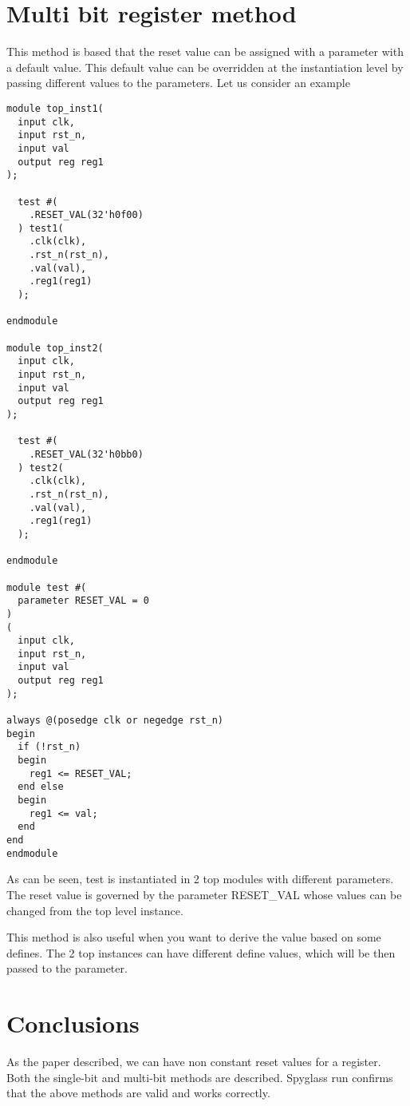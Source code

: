 \documentclass[twocolumn,10pt]{asme2ej}
\begin{document}
\section{Multi bit register method}
This method is based that the reset value can be assigned with a parameter
with a default value. 
This default value can be overridden at the instantiation level by passing
different values to the parameters. Let us consider an example

\begin{verbatim}
module top_inst1(
  input clk,
  input rst_n,
  input val
  output reg reg1
);

  test #(
    .RESET_VAL(32'h0f00)
  ) test1(
    .clk(clk),
    .rst_n(rst_n),
    .val(val),
    .reg1(reg1)
  );
  
endmodule

module top_inst2(
  input clk,
  input rst_n,
  input val
  output reg reg1
);

  test #(
    .RESET_VAL(32'h0bb0)
  ) test2(
    .clk(clk),
    .rst_n(rst_n),
    .val(val),
    .reg1(reg1)
  );
  
endmodule

module test #(
  parameter RESET_VAL = 0
)
(
  input clk,
  input rst_n,
  input val
  output reg reg1
);

always @(posedge clk or negedge rst_n) 
begin
  if (!rst_n) 
  begin
    reg1 <= RESET_VAL;
  end else 
  begin
    reg1 <= val;
  end
end
endmodule
\end{verbatim}


As can be seen, test is instantiated in 2 top modules 
with different parameters. The reset value is governed by the 
parameter RESET\_VAL whose values can be changed from the top level instance. 

This method is also useful when you want to derive the value based on some defines. 
The 2 top instances can have different define values, which will be then passed to the 
parameter. 

\section{Conclusions}
As the paper described, we can have non constant reset values for a register. 
Both the single-bit and multi-bit methods are described. 
Spyglass run confirms that the above methods are valid and works correctly. 

%
\end{document}
